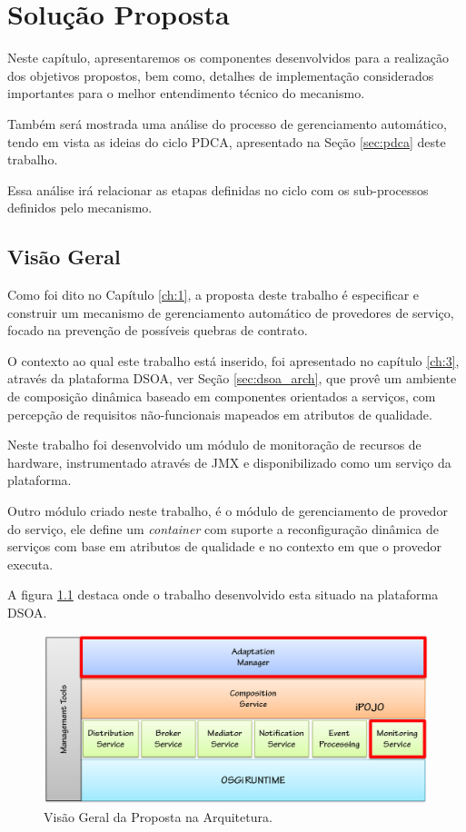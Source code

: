 \chapter{Solução Proposta}
\label{ch:4}

Neste capítulo, apresentaremos os componentes desenvolvidos para a realização dos objetivos propostos, bem como, detalhes de implementação considerados importantes para o melhor entendimento técnico do mecanismo. 

Também será mostrada uma análise do processo de gerenciamento automático, tendo em vista as ideias do ciclo PDCA, apresentado na Seção \ref{sec:pdca} deste trabalho. 

Essa análise irá relacionar as etapas definidas no ciclo com os sub-processos definidos pelo mecanismo.

\section{Visão Geral}
Como foi dito no Capítulo \ref{ch:1}, a proposta deste trabalho é especificar e construir um mecanismo de gerenciamento automático de provedores de serviço, focado na prevenção de possíveis quebras de contrato.

O contexto ao qual este trabalho está inserido, foi apresentado no capítulo \ref{ch:3}, através da plataforma DSOA, ver Seção \ref{sec:dsoa_arch}, que provê um ambiente de composição dinâmica baseado em componentes orientados a serviços, com percepção de requisitos não-funcionais mapeados em atributos de qualidade.

Neste trabalho foi desenvolvido um módulo de monitoração de recursos de hardware, instrumentado através de JMX e disponibilizado como um serviço da plataforma. 

Outro módulo criado neste trabalho, é o módulo de gerenciamento de provedor do serviço, ele define um \textit{container} com suporte a reconfiguração dinâmica de serviços com base em atributos de qualidade e no contexto em que o provedor executa.

A figura \ref{fig:proposal} destaca onde o trabalho desenvolvido esta situado na plataforma DSOA.

\begin{figure}[htp]
\centering
\includegraphics[width=13cm]{chapters/chapter4/dsoa-provider-manager.png}
\caption[Visão Geral da Proposta na Arquitetura]{Visão Geral da Proposta na Arquitetura.}
\label{fig:proposal}
\end{figure}

